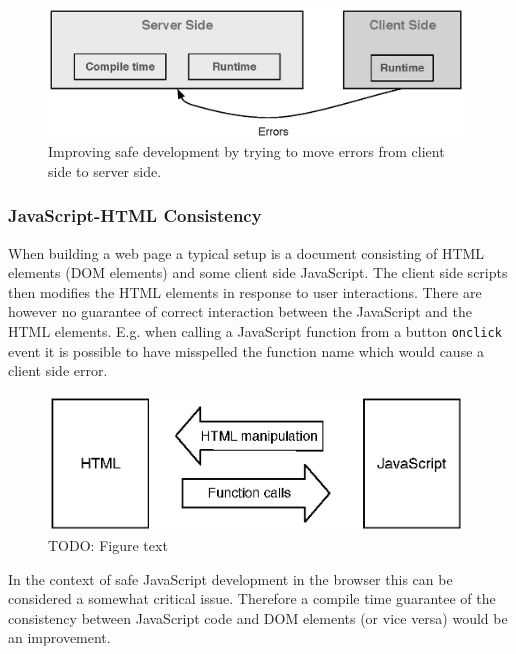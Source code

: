 			\begin{figure}
				\begin{center}
					\centerline{\includegraphics[width=11cm]{resources/images/MovingErrors.eps}}
				\end{center}
				\caption{Improving safe development by trying to move errors from client side to server side.}
				\label{movingErrors}
			\end{figure}

		\subsubsection{JavaScript-HTML Consistency} %
		\label{ssub:javascript_html_consistency}
			When building a web page a typical setup is a document consisting of HTML elements (DOM elements) and some client side JavaScript. The client side scripts then modifies the HTML elements in response to user interactions. There are however no guarantee of correct interaction between the JavaScript and the HTML elements. E.g. when calling a JavaScript function from a button \texttt{onclick} event it is possible to have misspelled the function name which would cause a client side error.

			\begin{figure}
				\begin{center}
					\centerline{\includegraphics[width=11cm]{resources/images/javascript-html-consistency.eps}}
				\end{center}
				\caption{TODO: Figure text}
				\label{fig:javascript_html_consistency}
			\end{figure}

			In the context of safe JavaScript development in the browser this can be considered a somewhat critical issue. Therefore a compile time guarantee of the consistency between JavaScript code and DOM elements (or vice versa) would be an improvement.

